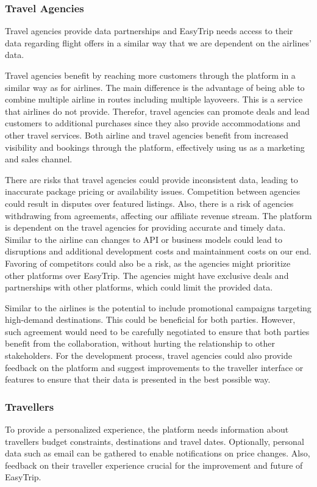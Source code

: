 \subsubsection{Travel Agencies}
Travel agencies provide data partnerships and EasyTrip needs access to their data regarding flight offers in a similar way that we are dependent on the airlines' data.


Travel agencies benefit by reaching more customers through the platform in a similar way as for airlines. The main difference is the advantage of being able to combine multiple airline in routes including multiple layoveers. This is a service that airlines do not provide. Therefor, travel agencies can promote deals and lead customers to additional purchases since they also provide accommodations and other travel services. Both airline and travel agencies benefit from increased visibility and bookings through the platform, effectively using us as a marketing and sales channel.


There are risks that travel agencies could provide inconsistent data, leading to inaccurate package pricing or availability issues. Competition between agencies could result in disputes over featured listings. Also, there is a risk of agencies withdrawing from agreements, affecting our affiliate revenue stream. The platform is dependent on the travel agencies for providing accurate and timely data. Similar to the airline can changes to API or business models could lead to disruptions and additional development costs and maintainment costs on our end. Favoring of competitors could also be a risk, as the agencies might prioritize other platforms over EasyTrip. The agencies might have exclusive deals and partnerships with other platforms, which could limit the provided data.


Similar to the airlines is the potential to include promotional campaigns targeting high-demand destinations. This could be beneficial for both parties. However, such agreement would need to be carefully negotiated to ensure that both parties benefit from the collaboration, without hurting the relationship to other stakeholders. For the development process, travel agencies could also provide feedback on the platform and suggest improvements to the traveller interface or features to ensure that their data is presented in the best possible way.

\subsubsection{Travellers}
To provide a personalized experience, the platform needs information about travellers budget constraints, destinations and travel dates. Optionally, personal data such as email can be gathered to enable notifications on price changes. Also, feedback on their traveller experience crucial for the improvement and future of EasyTrip.


